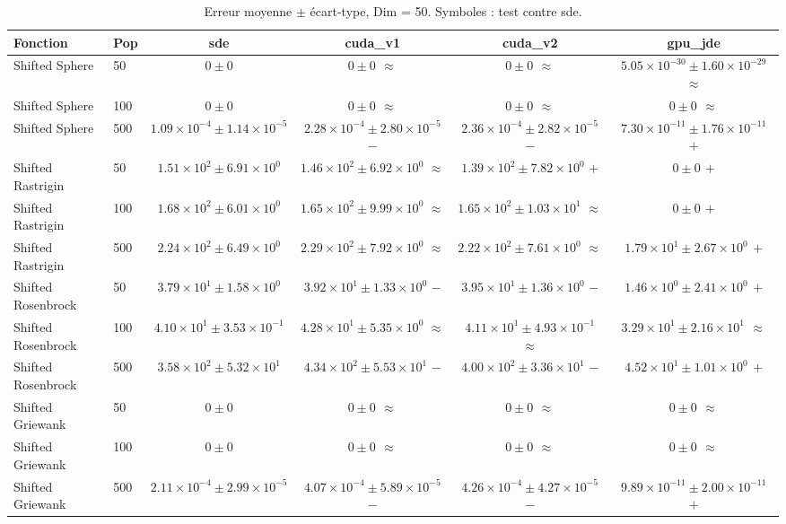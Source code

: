 \begin{table}[t]
\centering
\caption{Erreur moyenne $\pm$ écart-type, Dim = 50. Symboles : test contre sde.}
\label{tab:quality_d50}
\scriptsize
\begin{tabular}{llcccc}
\toprule
Fonction & Pop & sde & cuda\_v1 & cuda\_v2 & gpu\_jde \\
\midrule
Shifted Sphere & 50 & \textbf{$0\pm0$} & \textbf{$0\pm0$ $\approx$} & \textbf{$0\pm0$ $\approx$} & $5.05\times10^{-30}\pm1.60\times10^{-29}$ $\approx$ \\
Shifted Sphere & 100 & \textbf{$0\pm0$} & \textbf{$0\pm0$ $\approx$} & \textbf{$0\pm0$ $\approx$} & \textbf{$0\pm0$ $\approx$} \\
Shifted Sphere & 500 & $1.09\times10^{-4}\pm1.14\times10^{-5}$ & $2.28\times10^{-4}\pm2.80\times10^{-5}$ $-$ & $2.36\times10^{-4}\pm2.82\times10^{-5}$ $-$ & \textbf{$7.30\times10^{-11}\pm1.76\times10^{-11}$ $+$} \\
Shifted Rastrigin & 50 & $1.51\times10^{2}\pm6.91\times10^{0}$ & $1.46\times10^{2}\pm6.92\times10^{0}$ $\approx$ & $1.39\times10^{2}\pm7.82\times10^{0}$ $+$ & \textbf{$0\pm0$ $+$} \\
Shifted Rastrigin & 100 & $1.68\times10^{2}\pm6.01\times10^{0}$ & $1.65\times10^{2}\pm9.99\times10^{0}$ $\approx$ & $1.65\times10^{2}\pm1.03\times10^{1}$ $\approx$ & \textbf{$0\pm0$ $+$} \\
Shifted Rastrigin & 500 & $2.24\times10^{2}\pm6.49\times10^{0}$ & $2.29\times10^{2}\pm7.92\times10^{0}$ $\approx$ & $2.22\times10^{2}\pm7.61\times10^{0}$ $\approx$ & \textbf{$1.79\times10^{1}\pm2.67\times10^{0}$ $+$} \\
Shifted Rosenbrock & 50 & $3.79\times10^{1}\pm1.58\times10^{0}$ & $3.92\times10^{1}\pm1.33\times10^{0}$ $-$ & $3.95\times10^{1}\pm1.36\times10^{0}$ $-$ & \textbf{$1.46\times10^{0}\pm2.41\times10^{0}$ $+$} \\
Shifted Rosenbrock & 100 & $4.10\times10^{1}\pm3.53\times10^{-1}$ & $4.28\times10^{1}\pm5.35\times10^{0}$ $\approx$ & $4.11\times10^{1}\pm4.93\times10^{-1}$ $\approx$ & \textbf{$3.29\times10^{1}\pm2.16\times10^{1}$ $\approx$} \\
Shifted Rosenbrock & 500 & $3.58\times10^{2}\pm5.32\times10^{1}$ & $4.34\times10^{2}\pm5.53\times10^{1}$ $-$ & $4.00\times10^{2}\pm3.36\times10^{1}$ $-$ & \textbf{$4.52\times10^{1}\pm1.01\times10^{0}$ $+$} \\
Shifted Griewank & 50 & \textbf{$0\pm0$} & \textbf{$0\pm0$ $\approx$} & \textbf{$0\pm0$ $\approx$} & \textbf{$0\pm0$ $\approx$} \\
Shifted Griewank & 100 & \textbf{$0\pm0$} & \textbf{$0\pm0$ $\approx$} & \textbf{$0\pm0$ $\approx$} & \textbf{$0\pm0$ $\approx$} \\
Shifted Griewank & 500 & $2.11\times10^{-4}\pm2.99\times10^{-5}$ & $4.07\times10^{-4}\pm5.89\times10^{-5}$ $-$ & $4.26\times10^{-4}\pm4.27\times10^{-5}$ $-$ & \textbf{$9.89\times10^{-11}\pm2.00\times10^{-11}$ $+$} \\
\bottomrule
\end{tabular}
\end{table}
